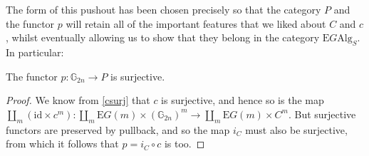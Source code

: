 The form of this pushout has been chosen precisely so that the category $P$ and the functor $p$ will retain all of the important features that we liked about $C$ and $c$, whilst eventually allowing us to show that they belong in the category $\mathrm{E}G\mathrm{Alg}_S$. In particular:

\begin{lem}\label{psurj} The functor $p: \mathbb{G}_{2n} \to P$ is surjective.
\end{lem}
\begin{proof}
We know from \cref{csurj} that $c$ is surjective, and hence so is the map $\coprod_m (\mathrm{id} \times c^m): \coprod_m \mathrm{E}G(m) \times (\mathbb{G}_{2n})^m \to \coprod_m \mathrm{E}G(m) \times C^m$. But surjective functors are preserved by pullback, and so the map $i_C$ must also be surjective, from which it follows that $p =  i_C \circ c$ is too. 
\end{proof}

